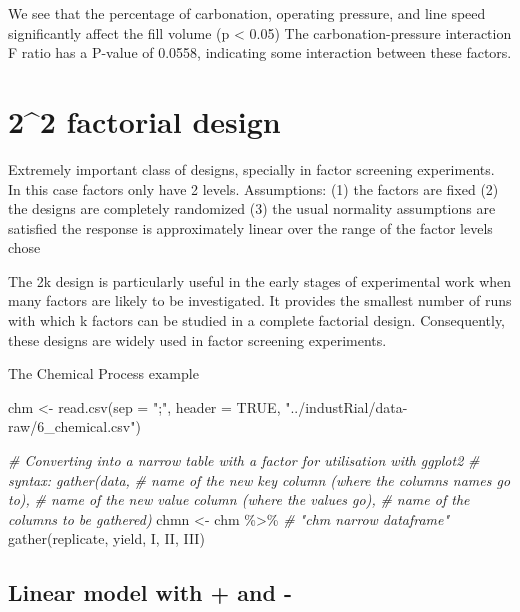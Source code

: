 \documentclass[
]{book}
\newenvironment{Shaded}{\begin{snugshade}}{\end{snugshade}}
\newcommand{\AttributeTok}[1]{\textcolor[rgb]{0.77,0.63,0.00}{#1}}
\newcommand{\CommentTok}[1]{\textcolor[rgb]{0.56,0.35,0.01}{\textit{#1}}}
\newcommand{\ConstantTok}[1]{\textcolor[rgb]{0.00,0.00,0.00}{#1}}
\newcommand{\FunctionTok}[1]{\textcolor[rgb]{0.00,0.00,0.00}{#1}}
\newcommand{\NormalTok}[1]{#1}
\newcommand{\OtherTok}[1]{\textcolor[rgb]{0.56,0.35,0.01}{#1}}
\newcommand{\SpecialCharTok}[1]{\textcolor[rgb]{0.00,0.00,0.00}{#1}}
\newcommand{\StringTok}[1]{\textcolor[rgb]{0.31,0.60,0.02}{#1}}
\begin{document}
We see that the percentage of carbonation, operating pressure, and line speed significantly affect the fill volume (p \textless{} 0.05)
The carbonation-pressure interaction F ratio has a P-value of 0.0558, indicating
some interaction between these factors.

\hypertarget{factorial-design}{%
\section{2\^{}2 factorial design}\label{factorial-design}}

Extremely important class of designs, specially in factor screening experiments.
In this case factors only have 2 levels. Assumptions:
(1) the factors are fixed
(2) the designs are completely randomized
(3) the usual normality assumptions are satisfied
the response is approximately linear over the range of the factor levels chose

The 2k design is particularly useful in the early stages of experimental work when many
factors are likely to be investigated. It provides the smallest number of runs with which k factors
can be studied in a complete factorial design. Consequently, these designs are widely
used in factor screening experiments.

The Chemical Process example

\begin{Shaded}
\begin{Highlighting}[]
\NormalTok{chm }\OtherTok{\textless{}{-}} \FunctionTok{read.csv}\NormalTok{(}\AttributeTok{sep =} \StringTok{";"}\NormalTok{, }\AttributeTok{header =} \ConstantTok{TRUE}\NormalTok{, }\StringTok{"../industRial/data{-}raw/6\_chemical.csv"}\NormalTok{)}

\CommentTok{\# Converting into a narrow table with a factor for utilisation with ggplot2}
\CommentTok{\# syntax: gather(data, }
\CommentTok{\#               name of the new key column (where the columns names go to), }
\CommentTok{\#               name of the new value column (where the values go), }
\CommentTok{\#               name of the columns to be gathered)}
\NormalTok{chmn }\OtherTok{\textless{}{-}}\NormalTok{ chm }\SpecialCharTok{\%\textgreater{}\%} \CommentTok{\# "chm narrow dataframe"}
  \FunctionTok{gather}\NormalTok{(replicate, yield, I, II, III)}
\end{Highlighting}
\end{Shaded}

\hypertarget{linear-model-with-and--}{%
\subsection{Linear model with + and -}\label{linear-model-with-and--}}
\end{document}
